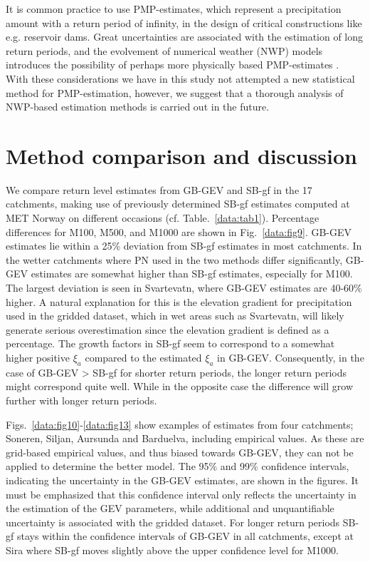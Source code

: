 \documentclass[12pt,a4paper,english]{article}
\begin{document}
It is common practice to use PMP-estimates, which represent a precipitation amount with a return period of infinity, in the design of critical constructions like e.g. reservoir dams. %
Great uncertainties are associated with the estimation of long return periods, and the evolvement of numerical weather (NWP) models introduces the possibility of perhaps more physically based PMP-estimates \citep{Cottonetal2003,WMO2009a}. With these considerations we have in this study not attempted a new statistical method for PMP-estimation, however, we suggest that a thorough analysis of NWP-based estimation methods is carried out in the future. 

\section{Method comparison and discussion}

We compare return level estimates from GB-GEV and SB-gf in the 17 catchments, making use of previously determined SB-gf estimates computed at MET Norway on different occasions (cf. Table.~\ref{data:tab1}). Percentage differences for M100, M500, and M1000 are shown in Fig.~\ref{data:fig9}. GB-GEV estimates lie within a 25\% deviation from SB-gf estimates in most catchments. In the wetter catchments where PN used in the two methods differ significantly, GB-GEV estimates are somewhat higher than SB-gf estimates, especially for M100. The largest deviation is seen in Svartevatn, where GB-GEV estimates are 40-60\% higher. A natural explanation for this is the elevation gradient for precipitation used in the gridded dataset, which in wet areas such as Svartevatn, will likely generate serious overestimation since the elevation gradient is defined as a percentage. The growth factors in SB-gf seem to correspond to a somewhat higher positive $\xi_{a}$ compared to the estimated $\xi_{a}$ in GB-GEV. Consequently, in the case of GB-GEV > SB-gf for shorter return periods, the longer return periods might correspond quite well. While in the opposite case the difference will grow further with longer return periods. 

Figs.~\ref{data:fig10}-\ref{data:fig13} show examples of estimates from four catchments; Soneren, Siljan, Aursunda and Barduelva, including empirical values. As these are grid-based empirical values, and thus biased towards GB-GEV, they can not be applied to determine the better model. The 95\% and 99\% confidence intervals, indicating the uncertainty in the GB-GEV estimates, are shown in the figures. It must be emphasized that this confidence interval only reflects the uncertainty in the estimation of the GEV parameters, while additional and unquantifiable uncertainty is associated with the gridded dataset. For longer return periods SB-gf stays within the confidence intervals of GB-GEV in all catchments, except at Sira where SB-gf moves slightly above the upper confidence level for M1000. 
\end{document}
